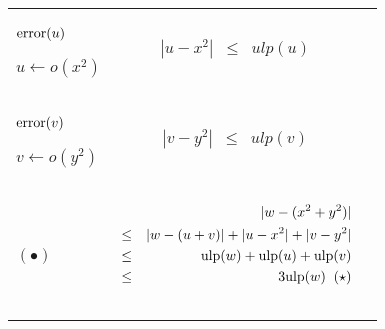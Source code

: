 \documentclass[12pt]{amsart}
\def\minf{\bigtriangledown}
\def\ulp{{\rm ulp}}
\begin{document}
\begin{center}
\begin{tabular}{l l l}

\begin{minipage}{2.5cm}


${\textnormal{error}}(u)$


$u \leftarrow o(x^2)$

\end{minipage} &
\begin{minipage}{7.5cm}

\begin{eqnarray}\nonumber
  |u-x^2| &\leq& ulp(u)\\\nonumber
\end{eqnarray}

\end{minipage} &
\begin{minipage}{6cm}
{\hspace{7cm}}
\end{minipage}\\%
\begin{minipage}{2.5cm}
${\textnormal{error}}(v)$


$v \leftarrow o({y}^{2}) $

\end{minipage} &
\begin{minipage}{7.5cm}

\begin{eqnarray}\nonumber
  |v-y^2| &\leq& ulp(v)\\\nonumber
\end{eqnarray}


\end{minipage} &
\begin{minipage}{6cm}


\end{minipage}\\%
\begin{minipage}{2.5cm}
${\textnormal{error}}(w)$


$w \leftarrow \minf(u+v) $\\
$(\bullet)$
\end{minipage} &
\begin{minipage}{7.8cm}



\begin{eqnarray}\nonumber
  &&|w-(x^2+y^2)| \\\nonumber
  &       \leq&  |w - (u+v)|+|u - x^2|+|v - y^2|\\\nonumber
  &       \leq& \ulp(w) + \ulp(u) + \ulp(v)\\\nonumber
  &       \leq& 3\ulp(w)\;\;(\star)\\\nonumber
\end{eqnarray}



\end{minipage}
\end{tabular}
\end{center}
\end{document}
